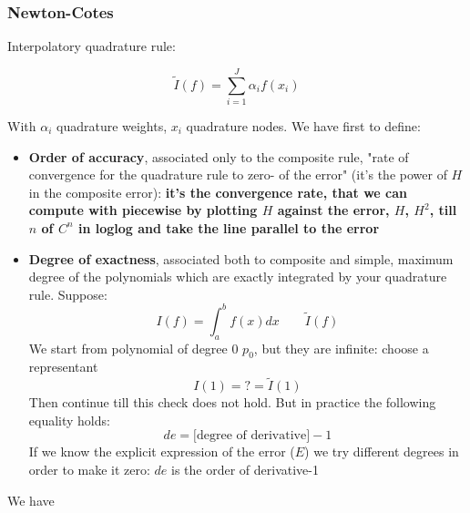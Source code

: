 \subsubsection{Newton-Cotes}
Interpolatory quadrature rule:
\begin{LARGE}
    $$
    \tilde{I}(f)=\sum_{i=1}^J\alpha_if(x_i)
    $$
\end{LARGE}
With $\alpha_i$ quadrature weights, $x_i$ quadrature nodes. We have first to define:
\begin{itemize}
    \item \textbf{Order of accuracy}, associated only to the composite rule, "rate of convergence for the quadrature rule to zero- of the error" (it's the power of $H$ in the composite error): \textbf{it's the convergence rate, that we can compute with piecewise by plotting $H$ against the error, $H$, $H^2$, till $n$ of $C^n$ in loglog and take the line parallel to the error}
    \item \textbf{Degree of exactness}, associated both to composite and simple, maximum degree of the polynomials which are exactly integrated by your quadrature rule. Suppose:
    $$
    I(f)=\int_a^bf(x)dx\qquad\tilde{I}(f)
    $$
    We start from polynomial of degree 0 $p_0$, but they are infinite: choose a representant
    $$
    I(1)=?=\tilde{I}(1)
    $$
    Then continue till this check does not hold. But in practice the following equality holds:
    $$
    de=\text{[degree of derivative]}-1
    $$
    If we know the explicit expression of the error ($E$) we try different degrees in order to make it zero: $de$ is the order of derivative-1
\end{itemize}
We have
